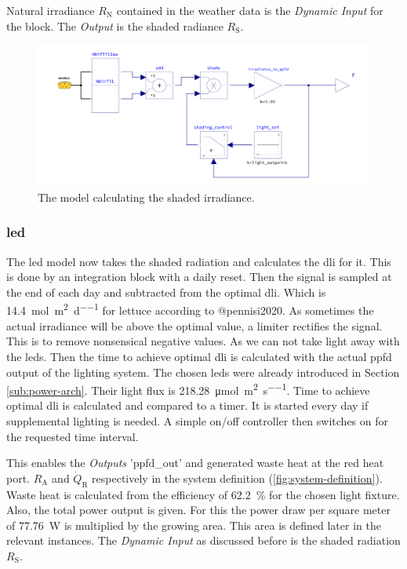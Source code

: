 Natural irradiance $R_\text{N}$ contained in the weather data is the \textit{Dynamic Input} for the block.
The \textit{Output} is the shaded radiance $R_\text{S}$.

\begin{figure}[htbp]
  \centering
  \includegraphics[width=\textwidth]{img/simulation/shading.pdf}
  \caption{The model calculating the shaded irradiance.}
  \label{fig:shading}
\end{figure}


\subsubsection{\ac{led}}
The \ac{led} model now takes the shaded radiation and calculates the \ac{dli} for it.
This is done by an integration block with a daily reset.
Then the signal is sampled at the end of each day and subtracted from the optimal \ac{dli}.
Which is \SI{14.4}{\mol\per\square\m\per\day} for lettuce according to @pennisi2020.
As sometimes the actual irradiance will be above the optimal value, a limiter rectifies the signal.
This is to remove nonsensical negative values.
As we can not take light away with the \acp{led}.
Then the time to achieve optimal \ac{dli} is calculated with the actual \ac{ppfd} output of the lighting system.
The chosen \acp{led} were already introduced in Section \ref{sub:power-arch}.
Their light flux is \SI{218.28}{\umol\per\square\m\per\s}.
Time to achieve optimal \ac{dli} is calculated and compared to a timer.
It is started every day if supplemental lighting is needed.
A simple on/off controller then switches on for the requested time interval.

This enables the \textit{Outputs} 'ppfd\_out' and generated waste heat at the red heat port.
$R_\text{A}$ and $\dot{Q}_\text{R}$ respectively in the system definition (\ref{fig:system-definition}).
Waste heat is calculated from the efficiency of \SI{62.2}{\percent} for the chosen light fixture.
Also, the total power output is given.
For this the power draw per square meter of \SI{77.76}{\W} is multiplied by the growing area.
This area is defined later in the relevant instances.
The \textit{Dynamic Input} as discussed before is the shaded radiation $R_\text{S}$.

